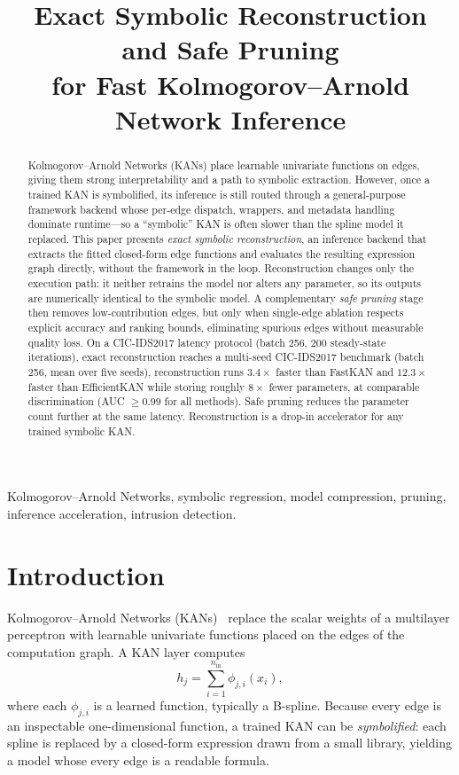 \documentclass[conference]{IEEEtran}
\title{Exact Symbolic Reconstruction and Safe Pruning\\
for Fast Kolmogorov--Arnold Network Inference}
\author{
\IEEEauthorblockN{Tamer A. Lafia}
\IEEEauthorblockN{}

\IEEEauthorblockA{
École Nationale Polytechnique d'Alger\\
École de technologie supérieure, Montréal\\
Email: \texttt{[lafia.tamer.16@gmail.com]}
}
}
\begin{document}
\maketitle

\begin{abstract}
Kolmogorov--Arnold Networks (KANs) place learnable univariate functions on
edges, giving them strong interpretability and a path to symbolic extraction.
However, once a trained KAN is symbolified, its inference is still routed
through a general-purpose framework backend whose per-edge dispatch, wrappers,
and metadata handling dominate runtime---so a ``symbolic'' KAN is often slower
than the spline model it replaced. This paper presents \emph{exact symbolic
reconstruction}, an inference backend that extracts the fitted closed-form edge
functions and evaluates the resulting expression graph directly, without the
framework in the loop. Reconstruction changes only the execution path: it
neither retrains the model nor alters any parameter, so its outputs are
numerically identical to the symbolic model. A complementary \emph{safe
pruning} stage then removes low-contribution edges, but only when single-edge
ablation respects explicit accuracy and ranking bounds, eliminating spurious
edges without measurable quality loss. On a CIC-IDS2017 latency protocol
(batch 256, 200 steady-state iterations), exact reconstruction reaches a
multi-seed CIC-IDS2017 benchmark (batch 256, mean over five seeds),
reconstruction runs $3.4\times$ faster than FastKAN and $12.3\times$ faster
than EfficientKAN while storing roughly $8\times$ fewer parameters, at
comparable discrimination (AUC $\geq 0.99$ for all methods). Safe pruning
reduces the parameter count further at the same latency. Reconstruction is a
drop-in accelerator for any trained symbolic KAN.
\end{abstract}

\begin{IEEEkeywords}
Kolmogorov--Arnold Networks, symbolic regression, model compression, pruning,
inference acceleration, intrusion detection.
\end{IEEEkeywords}

\section{Introduction}

Kolmogorov--Arnold Networks (KANs)~\cite{kan} replace the scalar weights of a
multilayer perceptron with learnable univariate functions placed on the edges
of the computation graph. A KAN layer computes
\begin{equation}
h_j = \sum_{i=1}^{n_{\mathrm{in}}} \phi_{j,i}(x_i),
\label{eq:kan_layer}
\end{equation}
where each $\phi_{j,i}$ is a learned function, typically a B-spline. Because
every edge is an inspectable one-dimensional function, a trained KAN can be
\emph{symbolified}: each spline is replaced by a closed-form expression drawn
from a small library, yielding a model whose every edge is a readable formula.
\end{document}

